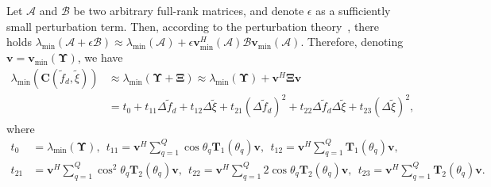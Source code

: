 \documentclass[12pt, draftclsnofoot, onecolumn]{IEEEtran}
\begin{document}
Let $\mathcal{A}$ and $\mathcal{B}$ be two arbitrary full-rank matrices,
and denote $\epsilon$ as a sufficiently small perturbation term. Then, according to the perturbation theory~\cite{bJH_Wilkinson1965, W_Zhang2016TSP}, there holds ${{\lambda }_{\min }}\left( \mathcal{A} \!+\! \epsilon\mathcal{B} \right) \!\approx\! {{\lambda }_{\min }}\left( \mathcal{A} \right) \!+\! \epsilon {{\mathbf{v}}_{\mathrm{min}}^{H}}\left( \mathcal{A} \right) \mathcal{B} {{\mathbf{v}}_{\mathrm{min}}}\left( \mathcal{A} \right)$. Therefore, denoting $\mathbf{v} \!=\! {\mathbf{v }_{\min }}\left( {\mathbf{\Upsilon}} \right)$, we have
\begin{align}
 {{\lambda }_{\min }}\left( \mathbf{C}\left( {{{\tilde{f}}}_{d}}, \tilde{\xi } \right) \right) & \approx {{\lambda }_{\min }}\left( {\mathbf{\Upsilon}} + {\mathbf{\Xi}} \right) \approx {{\lambda }_{\min }}\left( {\mathbf{\Upsilon}} \right) +{{\mathbf{v}}^{H}} {\mathbf{\Xi}} \mathbf{v} \nonumber \\
 & = {{t}_{0}}+{{t}_{11}}\Delta {\tilde{f}_{d}}+{{t}_{12}}\Delta \tilde\xi+{{t}_{21}}{{\left( \Delta {\tilde{f}_{d}} \right)}^{2}} +{{t}_{22}}\Delta {\tilde{f}_{d}}\Delta \tilde\xi+{{t}_{23}}{{\left( \Delta \tilde\xi  \right)}^{2}},
\end{align}
where
\begin{align*}
{{t}_{0}} & ={{\lambda }_{\min }} \left( {\mathbf{\Upsilon}} \right), \ \ {{t}_{11}} = {{\mathbf{v}}^{H}} \sum\nolimits_{q=1}^{Q}{\cos{{\theta }_{q}}{{\mathbf{T}}_{1}}\left( {{\theta }_{q}} \right)}\mathbf{v}, \ \ {{t}_{12}} ={{\mathbf{v}}^{H}} \sum\nolimits_{q=1}^{Q}{{{\mathbf{T}}_{1}}\left( {{\theta }_{q}} \right)} \mathbf{v}, \nonumber \\
{{t}_{21}} & ={{\mathbf{v}}^{H}} \sum\nolimits_{q=1}^{Q}{{{\cos}^{2}}{{\theta }_{q}}{{\mathbf{T}}_{2}}\left( {{\theta }_{q}} \right)} \mathbf{v}, \ \
 {{t}_{22}} ={{\mathbf{v}}^{H}} \sum\nolimits_{q=1}^{Q}{2\cos{{\theta }_{q}}{{\mathbf{T}}_{2}}\left( {{\theta }_{q}} \right)} \mathbf{v}, \ \ {{t}_{23}} ={{\mathbf{v}}^{H}} \sum\nolimits_{q=1}^{Q}{{{\mathbf{T}}_{2}}\left( {{\theta }_{q}} \right)}\mathbf{v}.
\end{align*}
\end{document}
